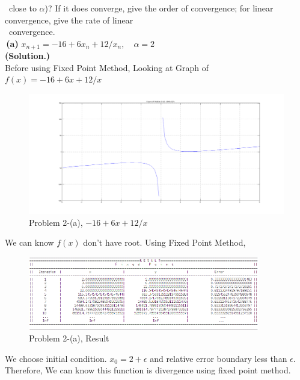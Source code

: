 \documentclass[10pt]{article}
\begin{document}
\begin{flushleft}
	\quad\, close to $\alpha$)? If it does converge, give the order of convergence; for linear convergence, give the rate of linear \\
	\quad\, convergence.\\
	\quad\,\textbf{(a)} $x_{n+1}=-16+6x_n+12/x_n,\quad \alpha=2$\\
	\;\;\;
	\qquad \quad \textbf{(Solution.)} \\
	\qquad \quad Before using Fixed Point Method, Looking at Graph of $f(x)=-16+6x+12/x$\\
	\begin{figure}[!h]
		\centering
		\begin{center}
		\includegraphics[width=1\textwidth]{2-a.png}
		\caption{Problem 2-(a), $-16+6x+12/x$ }
		\end{center}
	\end{figure}
	\qquad \quad We can know $f(x)$ don't have root. Using Fixed Point Method, \\
	\begin{figure}[!h]
		\centering
		\begin{center}
		\includegraphics[width=0.9\textwidth]{2-ra.png}
		\caption{Problem 2-(a), Result}
		\end{center}
	\end{figure}
	\qquad \quad We choose initial condition. $x_0=2+\epsilon$ and relative error boundary less than $\epsilon$.\\
	\qquad \quad Therefore, We can know this function is divergence using fixed point method.\\

\end{flushleft}
\end{document}
